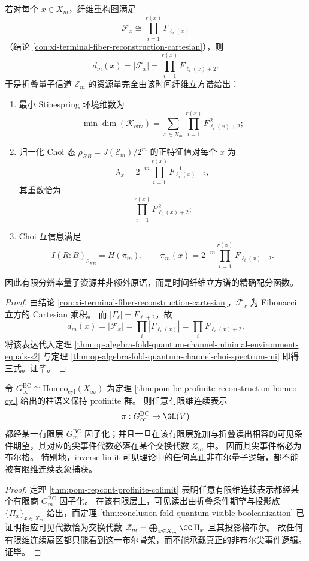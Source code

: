 \begin{corollary}\label{cor:conclusion-fold-quantum-fiber-spectrum-resource-partition}
若对每个 \(x\in X_m\)，纤维重构图满足
\[
\mathcal F_x\cong \prod_{i=1}^{r(x)}\Gamma_{\ell_i(x)}
\]
（结论 \ref{con:xi-terminal-fiber-reconstruction-cartesian}），则
\[
d_m(x)=|\mathcal F_x|=\prod_{i=1}^{r(x)}F_{\ell_i(x)+2}.
\]
于是折叠量子信道 \(\mathcal E_m\) 的资源量完全由该时间纤维立方谱给出：
\begin{enumerate}
  \item 最小 Stinespring 环境维数为
  \[
  \min\dim(\mathcal K_{\mathrm{env}})
  =
  \sum_{x\in X_m}\prod_{i=1}^{r(x)}F_{\ell_i(x)+2}^{\,2};
  \]
  \item 归一化 Choi 态 \(\rho_{RB}=J(\mathcal E_m)/2^m\) 的正特征值对每个 \(x\) 为
  \[
  \lambda_x
  =
  2^{-m}\prod_{i=1}^{r(x)}F_{\ell_i(x)+2}^{-1},
  \]
  其重数恰为
  \[
  \prod_{i=1}^{r(x)}F_{\ell_i(x)+2}^{\,2};
  \]
  \item Choi 互信息满足
  \[
  I(R\!:\!B)_{\rho_{RB}}=H(\pi_m),
  \qquad
  \pi_m(x)=2^{-m}\prod_{i=1}^{r(x)}F_{\ell_i(x)+2}.
  \]
\end{enumerate}
因此有限分辨率量子资源并非额外原语，而是时间纤维立方谱的精确配分函数。
\end{corollary}
\begin{proof}
由结论 \ref{con:xi-terminal-fiber-reconstruction-cartesian}，\(\mathcal F_x\) 为 Fibonacci 立方的 Cartesian 乘积。
而 \(|\Gamma_\ell|=F_{\ell+2}\)，故
\[
d_m(x)=|\mathcal F_x|=\prod_i |\Gamma_{\ell_i(x)}|
=\prod_i F_{\ell_i(x)+2}.
\]
将该表达代入定理 \ref{thm:op-algebra-fold-quantum-channel-minimal-environment-equals-s2} 与定理 \ref{thm:op-algebra-fold-quantum-channel-choi-spectrum-mi} 即得三式。证毕。
\end{proof}

\begin{corollary}\label{cor:conclusion-profinite-visible-logic-finite-dim-boolean}
令 \(G_\infty^{\mathrm{BC}}\cong \mathrm{Homeo}_{\mathrm{cyl}}(X_\infty)\) 为定理 \ref{thm:pom-bc-profinite-reconstruction-homeo-cyl} 给出的柱语义保持 profinite 群。
则任意有限维连续表示
\[
\pi:G_\infty^{\mathrm{BC}}\to \GL(V)
\]
都经某一有限层 \(G_m^{\mathrm{BC}}\) 因子化；并且一旦在该有限层施加与折叠读出相容的可见条件期望，其对应的尖事件代数必落在某个交换代数 \(\mathcal Z_m\) 中。
因而其尖事件格必为布尔格。
特别地，inverse-limit 可见理论中的任何真正非布尔量子逻辑，都不能被有限维连续表象捕获。
\end{corollary}
\begin{proof}
定理 \ref{thm:pom-repcont-profinite-colimit} 表明任意有限维连续表示都经某个有限商 \(G_m^{\mathrm{BC}}\) 因子化。
在该有限层上，可见读出由折叠条件期望与投影族 \(\{\Pi_x\}_{x\in X_m}\) 给出，而定理 \ref{thm:conclusion-fold-quantum-visible-booleanization} 已证明相应可见代数恰为交换代数
\(
\mathcal Z_m=\bigoplus_{x\in X_m}\CC\,\Pi_x
\)
且其投影格布尔。
故任何有限维连续扇区都只能看到这一布尔骨架，而不能承载真正的非布尔尖事件逻辑。证毕。
\end{proof}

